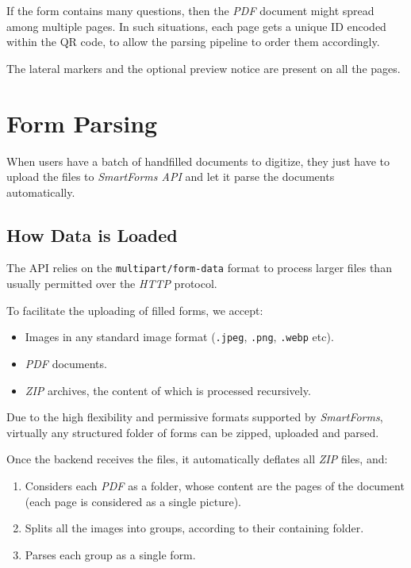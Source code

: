 \documentclass[11pt, a4paper]{report}
\def\code#1{\texttt{#1}}
\begin{document}
If the form contains many questions, then the \textit{PDF} document might spread among multiple pages. In such situations, each page gets a unique ID encoded within the QR code, to allow the parsing pipeline to order them accordingly.

The lateral markers and the optional preview notice are present on all the pages.



\chapter{Form Parsing}
\label{chapter-form-parsing}

When users have a batch of handfilled documents to digitize, they just have to upload the files to \textit{SmartForms API} and let it parse the documents automatically.

\section{How Data is Loaded}

The API relies on the \code{multipart/form-data} \cite{masinter1998rfc2388} format to process larger files than usually permitted over the \textit{HTTP} protocol.

To facilitate the uploading of filled forms, we accept:
\begin{itemize}
    \item Images in any standard image format (\code{.jpeg}, \code{.png}, \code{.webp} etc).
    \item \textit{PDF} documents.
    \item \textit{ZIP} archives, the content of which is processed recursively.
\end{itemize}

Due to the high flexibility and permissive formats supported by \textit{SmartForms}, virtually any structured folder of forms can be zipped, uploaded and parsed.

Once the backend receives the files, it automatically deflates all \textit{ZIP} files, and:
\begin{enumerate}
    \item Considers each \textit{PDF} as a folder, whose content are the pages of the document (each page is considered as a single picture).
    \item Splits all the images into groups, according to their containing folder.
    \item Parses each group as a single form.
\end{enumerate}
\end{document}
